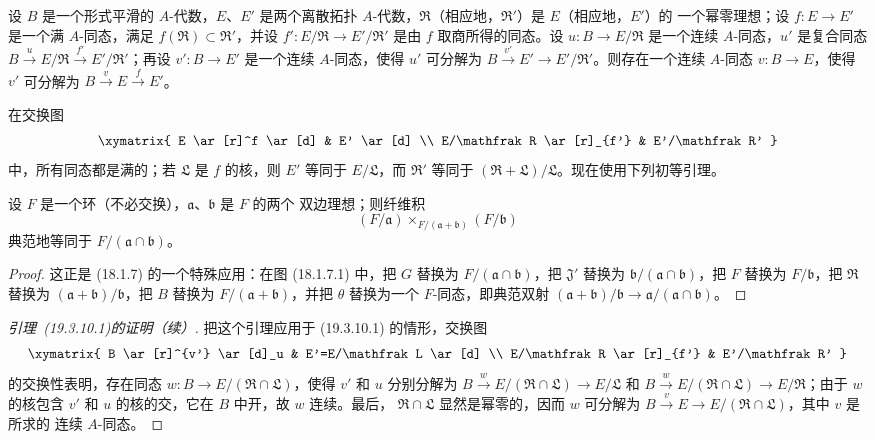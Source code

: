 \begin{lemma}[19.3.10.1]
\label{0.19.3.10.1-fr}
设 $B$ 是一个形式平滑的 $A$-代数，$E$、$E'$ 是两个离散拓扑
$A$-代数，$\mathfrak R$（相应地，$\mathfrak R'$）是 $E$（相应地，$E'$）的
一个幂零理想；设 $f:E\to E'$ 是一个满 $A$-同态，满足
$f(\mathfrak R)\subset\mathfrak R'$，并设
$f':E/\mathfrak R\to E'/\mathfrak R'$ 是由 $f$ 取商所得的同态。设
$u:B\to E/\mathfrak R$ 是一个连续 $A$-同态，$u'$ 是复合同态
$B\xrightarrow{u}E/\mathfrak R\xrightarrow{f'}E'/\mathfrak R'$；再设
$v':B\to E'$ 是一个连续 $A$-同态，使得 $u'$ 可分解为
$B\xrightarrow{v'}E'\to E'/\mathfrak R'$。则存在一个连续 $A$-同态
$v:B\to E$，使得 $v'$ 可分解为
$B\xrightarrow{v}E\xrightarrow{f}E'$。
\end{lemma}

在交换图
\[
\xymatrix{
  E \ar[r]^f \ar[d] & E' \ar[d] \\
  E/\mathfrak R \ar[r]_{f'} & E'/\mathfrak R'
}
\]
中，所有同态都是满的；若 $\mathfrak L$ 是 $f$ 的核，则 $E'$ 等同于
$E/\mathfrak L$，而 $\mathfrak R'$ 等同于
$(\mathfrak R+\mathfrak L)/\mathfrak L$。现在使用下列初等引理。

\begin{lemma}[19.3.10.2]
\label{0.19.3.10.2-fr}
设 $F$ 是一个环（不必交换），$\mathfrak a$、$\mathfrak b$ 是 $F$ 的两个
双边理想；则纤维积
\[
  (F/\mathfrak a)\times_{F/(\mathfrak a+\mathfrak b)}(F/\mathfrak b)
\]
典范地等同于 $F/(\mathfrak a\cap\mathfrak b)$。
\end{lemma}

\begin{proof}
这正是 (18.1.7) 的一个特殊应用：在图 (18.1.7.1) 中，把 $G$ 替换为
$F/(\mathfrak a\cap\mathfrak b)$，把 $\mathfrak J'$ 替换为
$\mathfrak b/(\mathfrak a\cap\mathfrak b)$，把 $F$ 替换为
$F/\mathfrak b$，把 $\mathfrak R$ 替换为
$(\mathfrak a+\mathfrak b)/\mathfrak b$，把 $B$ 替换为
$F/(\mathfrak a+\mathfrak b)$，并把 $\theta$ 替换为一个 $F$-同态，即典范双射
$(\mathfrak a+\mathfrak b)/\mathfrak b\to
\mathfrak a/(\mathfrak a\cap\mathfrak b)$。
\end{proof}


\begin{proof}[引理~{\rm(19.3.10.1)}的证明（续）]
把这个引理应用于 (19.3.10.1) 的情形，交换图
\[
\xymatrix{
  B \ar[r]^{v'} \ar[d]_u & E'=E/\mathfrak L \ar[d] \\
  E/\mathfrak R \ar[r]_{f'} & E'/\mathfrak R'
}
\]
的交换性表明，存在同态
$w:B\to E/(\mathfrak R\cap\mathfrak L)$，使得 $v'$ 和 $u$ 分别分解为
$B\xrightarrow{w}E/(\mathfrak R\cap\mathfrak L)\to E/\mathfrak L$
和
$B\xrightarrow{w}E/(\mathfrak R\cap\mathfrak L)\to E/\mathfrak R$；由于
$w$ 的核包含 $v'$ 和 $u$ 的核的交，它在 $B$ 中开，故 $w$ 连续。最后，
$\mathfrak R\cap\mathfrak L$ 显然是幂零的，因而 $w$ 可分解为
$B\xrightarrow{v}E\to E/(\mathfrak R\cap\mathfrak L)$，其中 $v$ 是所求的
连续 $A$-同态。
\end{proof}

